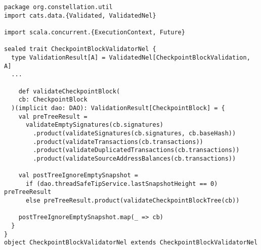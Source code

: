 \documentclass{article}
\begin{document}
\begin{lstlisting}[style=myScalastyle]
package org.constellation.util
import cats.data.{Validated, ValidatedNel}

import scala.concurrent.{ExecutionContext, Future}

sealed trait CheckpointBlockValidatorNel {
  type ValidationResult[A] = ValidatedNel[CheckpointBlockValidation, A]
  ...
  
    def validateCheckpointBlock(
    cb: CheckpointBlock
  )(implicit dao: DAO): ValidationResult[CheckpointBlock] = {
    val preTreeResult =
      validateEmptySignatures(cb.signatures)
        .product(validateSignatures(cb.signatures, cb.baseHash))
        .product(validateTransactions(cb.transactions))
        .product(validateDuplicatedTransactions(cb.transactions))
        .product(validateSourceAddressBalances(cb.transactions))

    val postTreeIgnoreEmptySnapshot =
      if (dao.threadSafeTipService.lastSnapshotHeight == 0) preTreeResult
      else preTreeResult.product(validateCheckpointBlockTree(cb))

    postTreeIgnoreEmptySnapshot.map(_ => cb)
  }
}
object CheckpointBlockValidatorNel extends CheckpointBlockValidatorNel
\end{lstlisting}
\end{document}

